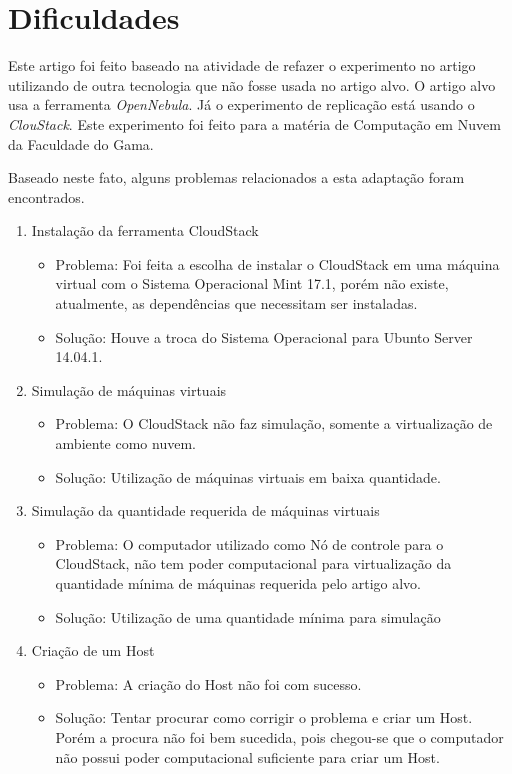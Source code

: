 \section{Dificuldades}
\label{sec:dificuldades}

Este artigo foi feito baseado na atividade de refazer o experimento no artigo \cite{coutinho_et_al:14} utilizando de outra tecnologia que não fosse usada no artigo alvo. O artigo alvo usa a ferramenta \textit{OpenNebula}. Já o experimento de replicação está usando o \textit{ClouStack}. Este experimento foi feito para a matéria de Computação em Nuvem da Faculdade do Gama.

Baseado neste fato, alguns problemas relacionados a esta adaptação foram encontrados.

\begin{enumerate}

  \item Instalação da ferramenta CloudStack

  \begin{itemize}
    \item Problema: Foi feita a escolha de instalar o CloudStack em uma máquina virtual com o Sistema Operacional Mint 17.1, porém não existe, atualmente, as dependências que necessitam ser instaladas.
    \item Solução: Houve a troca do Sistema Operacional para Ubunto Server 14.04.1.
  \end{itemize}

  \item Simulação de máquinas virtuais
  \begin{itemize}
    \item Problema: O CloudStack não faz simulação, somente a virtualização de ambiente como nuvem.
    \item Solução: Utilização de máquinas virtuais em baixa quantidade.
  \end{itemize}

  \item Simulação da quantidade requerida de máquinas virtuais
  \begin{itemize}
    \item Problema: O computador utilizado como Nó de controle para o CloudStack, não tem poder computacional para virtualização da quantidade mínima de máquinas requerida pelo artigo alvo.
    \item Solução: Utilização de uma quantidade mínima para simulação
  \end{itemize}

  \item Criação de um Host
  \begin{itemize}
    \item Problema: A criação do Host não foi com sucesso.
    \item Solução: Tentar procurar como corrigir o problema e criar um Host. Porém a procura não foi bem sucedida, pois chegou-se que o computador não possui poder computacional suficiente para criar um Host.
  \end{itemize}



\end{enumerate}


